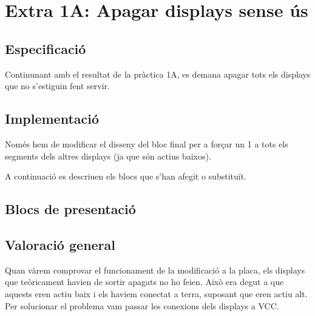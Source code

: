 \chapter{Extra 1A: Apagar displays sense ús}

\section{Especificació}

Continunant amb el resultat de la pràctica 1A, es demana apagar tots els
displays que no s'estiguin fent servir.

\section{Implementació}

Només hem de modificar el disseny del bloc final per a forçar un 1 a tots
els segments dels altres displays (ja que són actius baixos).

A continuació es descriuen els blocs que s'han afegit o substituït.

  \cclearpage
\section{Blocs de presentació}

\section{Valoració general}

Quan vàrem comprovar el funcionament de la modificació a la placa, els displays que teòricament havien de sortir apagats no ho feien. Això era degut a que aquests eren actiu baix i els haviem conectat a terra, suposant que eren actiu alt. Per solucionar el problema vam passar les conexions dels displays a \textsf{VCC}.

